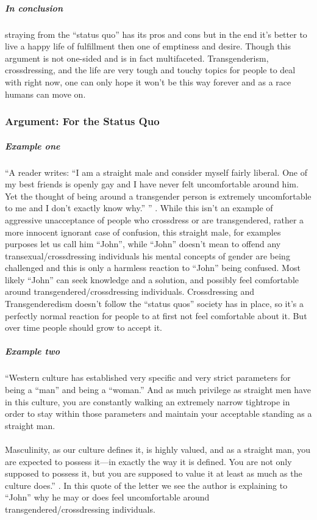 \subparagraph{In conclusion}
straying from the ``status quo'' has its pros and cons but in the end it's
better to live a happy life of fulfillment then one of emptiness and desire.
Though this argument is not one-sided and is in fact multifaceted.
Transgenderism, crossdressing, and the life are very tough and touchy topics for
people to deal with right now, one can only hope it won't be this way forever
and as a race humans can move on.
\par

\subsubsection{Argument: For the Status Quo}

\subparagraph{Example one}
``A reader writes: ``I am a straight male and consider myself fairly liberal.
One of my best friends is openly gay and I have never felt uncomfortable around
him. Yet the thought of being around a transgender person is extremely
uncomfortable to me and I don’t exactly know why.'' '' \cite[p.~1]{WDTMU} .
While this isn't an example of aggressive unacceptance of people who crossdress
or are transgendered, rather a more innocent ignorant case of confusion, this
straight male, for examples purposes let us call him ``John'', while ``John''
doesn't mean to offend any transexual/crossdressing individuals his mental
concepts of gender are being challenged and this is only a harmless reaction to
``John'' being confused. Most likely ``John'' can seek knowledge and a solution,
and possibly feel comfortable around transgendered/crossdressing individuals.
Crossdressing and Transgenderedism doesn't follow the ``status quos'' society
has in place, so it's a perfectly normal reaction for people to at first not
feel comfortable about it. But over time people should grow to accept it.
\par

\subparagraph{Example two}
``Western culture has established very specific and very strict parameters for
being a ``man'' and being a ``woman.'' And as much privilege as straight men
have in this culture, you are constantly walking an extremely narrow tightrope
in order to stay within those parameters and maintain your acceptable standing
as a straight man. \\~\\ Masculinity, as our culture defines it, is highly
valued, and as a straight man, you are expected to possess it---in exactly the
way it is defined. You are not only supposed to possess it, but you are supposed
to value it at least as much as the culture does.'' \cite[p.~1]{WDTMU} . In this
quote of the letter we see the author is explaining to ``John'' why he may or
does feel uncomfortable around transgendered/crossdressing individuals.
\par

